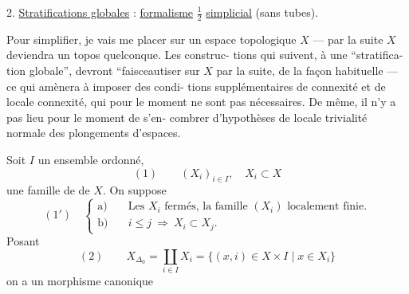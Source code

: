 2. \uline{Stratifications globales} : \uline{formalisme} $\frac12$ \uline{simplicial}
(sans tubes).

Pour simplifier, je vais me placer sur un
espace topologique $X$ --- par la suite $X$
deviendra un topos quelconque. Les construc-
tions qui suivent,  à une ``stratifica-
tion globale'', devront ``faisceautiser sur $X$
par la suite, de la façon habituelle ---
ce qui amènera  à imposer des condi-
tions supplémentaires de connexité et
de locale connexité, qui pour le moment
ne sont pas nécessaires. De même, il n'y
a pas lieu pour le moment de s'en-
combrer d'hypothèses de locale trivialité
normale des plongements d'espaces.

Soit $I$ un ensemble ordonné, 
\[
(1)\qquad (X_i)_{i\in I},\quad X_i\subset X
\]
une famille de  de $X$. On suppose
\[
(1')\quad\left\{\begin{aligned}
\text{a)}\quad&\text{Les }X_i\text{ fermés, la famille }(X_i)\text{ localement finie.}\\
\text{b)}\quad&i\leq j\ \Longrightarrow\ X_i\subset X_j.
\end{aligned}\right.
\]
Posant
\[
(2)\qquad X_{\Delta_0}=\coprod_{i\in I}X_i
=\{(x,i)\in X\times I\mid x\in X_i\}
\]
on a un morphisme canonique
